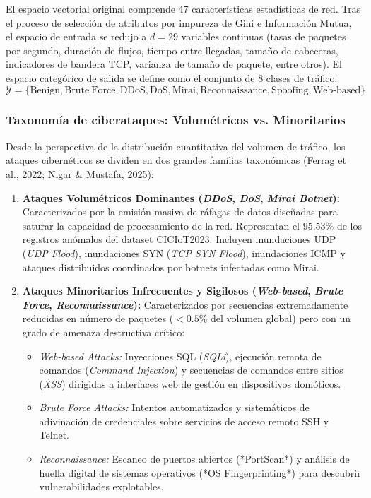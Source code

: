 El espacio vectorial original comprende 47 características estadísticas de red. Tras el proceso de selección de atributos por impureza de Gini e Información Mutua, el espacio de entrada se redujo a $d=29$ variables continuas (tasas de paquetes por segundo, duración de flujos, tiempo entre llegadas, tamaño de cabeceras, indicadores de bandera TCP, varianza de tamaño de paquete, entre otros). El espacio categórico de salida se define como el conjunto de 8 clases de tráfico:
\begin{equation}
\mathcal{Y} = \{\mathrm{Benign}, \mathrm{Brute\ Force}, \mathrm{DDoS}, \mathrm{DoS}, \mathrm{Mirai}, \mathrm{Reconnaissance}, \mathrm{Spoofing}, \mathrm{Web\text{-}based}\}
\end{equation}

\subsubsection{Taxonomía de ciberataques: Volumétricos vs. Minoritarios}
Desde la perspectiva de la distribución cuantitativa del volumen de tráfico, los ataques cibernéticos se dividen en dos grandes familias taxonómicas (Ferrag et al., 2022; Nigar \& Mustafa, 2025):
\begin{enumerate}
    \item \textbf{Ataques Volumétricos Dominantes (\textit{DDoS}, \textit{DoS}, \textit{Mirai Botnet}):} Caracterizados por la emisión masiva de ráfagas de datos diseñadas para saturar la capacidad de procesamiento de la red. Representan el $95.53\%$ de los registros anómalos del dataset CICIoT2023. Incluyen inundaciones UDP (\textit{UDP Flood}), inundaciones SYN (\textit{TCP SYN Flood}), inundaciones ICMP y ataques distribuidos coordinados por botnets infectadas como Mirai.
    \item \textbf{Ataques Minoritarios Infrecuentes y Sigilosos (\textit{Web-based}, \textit{Brute Force}, \textit{Reconnaissance}):} Caracterizados por secuencias extremadamente reducidas en número de paquetes ($<0.5\%$ del volumen global) pero con un grado de amenaza destructiva crítico:
    \begin{itemize}
        \item \textit{Web-based Attacks:} Inyecciones SQL (\textit{SQLi}), ejecución remota de comandos (\textit{Command Injection}) y secuencias de comandos entre sitios (\textit{XSS}) dirigidas a interfaces web de gestión en dispositivos domóticos.
        \item \textit{Brute Force Attacks:} Intentos automatizados y sistemáticos de adivinación de credenciales sobre servicios de acceso remoto SSH y Telnet.
        \item \textit{Reconnaissance:} Escaneo de puertos abiertos (*PortScan*) y análisis de huella digital de sistemas operativos (*OS Fingerprinting*) para descubrir vulnerabilidades explotables.
    \end{itemize}
\end{enumerate}

